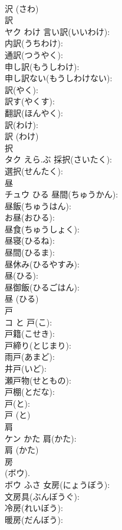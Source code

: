 \documentclass[8pt]{extreport}
\begin{document}
\begin{CJK}{UTF8}{min}
\\	沢 (さわ)
\\	訳			
\\	ヤク	わけ	言い訳(いいわけ): 
\\	内訳(うちわけ): 
\\	通訳(つうやく): 
\\	申し訳(もうしわけ): 
\\	申し訳ない(もうしわけない): 
\\	訳(やく): 
\\	訳す(やくす): 
\\	翻訳(ほんやく): 
\\	訳(わけ): 
\\	訳 (わけ)
\\	択			
\\	タク	えら.ぶ	採択(さいたく): 
\\	選択(せんたく): 
\\	昼			
\\	チュウ	ひる	昼間(ちゅうかん): 
\\	昼飯(ちゅうはん): 
\\	お昼(おひる): 
\\	昼食(ちゅうしょく): 
\\	昼寝(ひるね): 
\\	昼間(ひるま): 
\\	昼休み(ひるやすみ): 
\\	昼(ひる): 
\\	昼御飯(ひるごはん): 
\\	昼 (ひる)
\\	戸			
\\	コ	と	戸(こ): 
\\	戸籍(こせき): 
\\	戸締り(とじまり): 
\\	雨戸(あまど): 
\\	井戸(いど): 
\\	瀬戸物(せともの): 
\\	戸棚(とだな): 
\\	戸(と): 
\\	戸 (と)
\\	肩			
\\	ケン	かた	肩(かた): 
\\	肩 (かた)
\\	房			
\\	(ボウ).
\\	ボウ	ふさ	女房(にょうぼう): 
\\	文房具(ぶんぼうぐ): 
\\	冷房(れいぼう): 
\\	暖房(だんぼう): 

\end{CJK}
\end{document}
